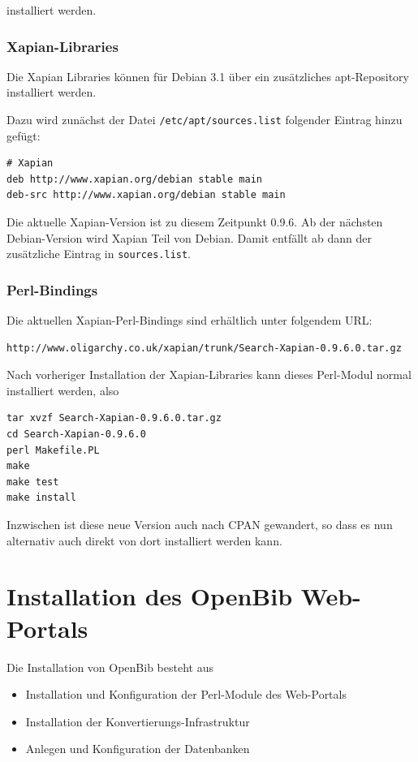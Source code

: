 \documentclass[11pt, twoside, a4paper, BCOR8mm, DIV12, bibtotoc,idxtotoc]{scrbook}
\begin{document}
installiert werden.

\subsection{Xapian-Libraries}

Die Xapian Libraries können für Debian 3.1 über ein zusätzliches apt-Repository
installiert werden.

Dazu wird zunächst der Datei \texttt{/etc/apt/sources.list} folgender
Eintrag hinzu gefügt:

\begin{verbatim}
# Xapian
deb http://www.xapian.org/debian stable main
deb-src http://www.xapian.org/debian stable main
\end{verbatim}

Die aktuelle Xapian-Version ist zu diesem Zeitpunkt 0.9.6. Ab der
nächsten Debian-Version wird Xapian Teil von Debian. Damit entfällt
ab dann der zusätzliche Eintrag in \texttt{sources.list}.

\subsection{Perl-Bindings}

Die aktuellen Xapian-Perl-Bindings sind erhältlich unter folgendem
URL:

\begin{verbatim}
http://www.oligarchy.co.uk/xapian/trunk/Search-Xapian-0.9.6.0.tar.gz
\end{verbatim}

Nach vorheriger Installation der Xapian-Libraries kann dieses
Perl-Modul normal installiert werden, also

\begin{verbatim}
tar xvzf Search-Xapian-0.9.6.0.tar.gz
cd Search-Xapian-0.9.6.0
perl Makefile.PL
make
make test
make install
\end{verbatim}

Inzwischen ist diese neue Version auch nach CPAN gewandert, so dass es
nun alternativ auch direkt von dort installiert werden kann.

\chapter{Installation des OpenBib Web-Portals}

Die Installation von OpenBib besteht aus

\begin{itemize}
\item Installation und Konfiguration der Perl-Module des Web-Portals
\item Installation der Konvertierungs-Infrastruktur
\item Anlegen und Konfiguration der Datenbanken
\end{itemize}
\end{document}
